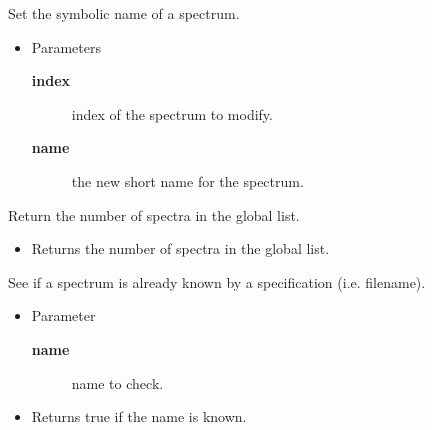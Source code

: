 \begin{desc}Set the symbolic name of a spectrum.
\begin{itemize}
\item{Parameters
  \begin{description}
   \item[\textbf{index}]{index of the spectrum to modify.}
   \item[\textbf{name}]{the new short name for the spectrum.}
  \end{description}}
\end{itemize}
\end{desc}

\begin{desc}Return the number of spectra in the global list.
\begin{itemize}
\item{Returns the number of spectra in the global list. }
\end{itemize}
\end{desc}

\begin{desc}See if a spectrum is already known by a specification (i.e. filename).
\begin{itemize}
\item{Parameter
  \begin{description}
   \item[\textbf{name}]{name to check.}
  \end{description}}
\end{itemize}
\begin{itemize}
\item{Returns true if the name is known. }
\end{itemize}
\end{desc}





\vspace{.09in}



